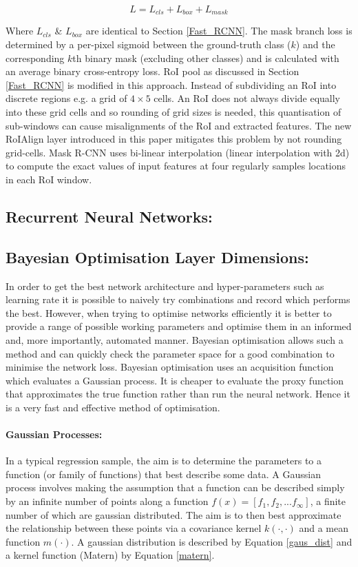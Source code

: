 \documentclass[11pt,twoside]{report}
\begin{document}
\begin{equation}
\label{maskrcnnloss}
L = L_{cls} + L_{box} + L_{mask}
\end{equation}

Where $L_{cls}$ \& $L_{box}$ are identical to Section \ref{Fast_RCNN}. The mask branch loss is determined by a per-pixel sigmoid between the ground-truth class ($k$) and the corresponding $k$th binary mask (excluding other classes) and is calculated with an average binary cross-entropy loss.
\newline \newline
RoI pool as discussed in Section \ref{Fast_RCNN} is modified in this approach. Instead of subdividing an RoI into discrete regions e.g. a grid of $4 \times 5$ cells. An RoI does not always divide equally into these grid cells and so rounding of grid sizes is needed, this quantisation of sub-windows can cause misalignments of the RoI and extracted features. The new RoIAlign layer introduced in this paper mitigates this problem by not rounding grid-cells. Mask R-CNN uses bi-linear interpolation (linear interpolation with 2d) to compute the exact values of input features at four regularly samples locations in each RoI window.


\subsection{Recurrent Neural Networks:}

\subsection{Bayesian Optimisation Layer Dimensions:}
In order to get the best network architecture and hyper-parameters such as learning rate it is possible to naively try combinations and record which performs the best. However, when trying to optimise networks efficiently it is better to provide a range of possible working parameters and optimise them in an informed and, more importantly, automated manner. Bayesian optimisation allows such a method and can quickly check the parameter space for a good combination to minimise the network loss. Bayesian optimisation uses an acquisition function which evaluates a Gaussian process. It is cheaper to evaluate the proxy function that approximates the true function rather than run the neural network. Hence it is a very fast and effective method of optimisation.

\paragraph{Gaussian Processes:}
In a typical regression sample, the aim is to determine the parameters to a function (or family of functions) that best describe some data. A Gaussian process involves making the assumption that a function can be described simply by an infinite number of points along a function $f(x) = [f_{1},f_{2},...f_{\infty}]$, a finite number of which are gaussian distributed. The aim is to then best approximate the relationship between these points via a covariance kernel $k(\cdot,\cdot)$ and a mean function $m(\cdot)$. A gaussian distribution is described by Equation \ref{gaus_dist} and a kernel function (Matern) by Equation \ref{matern}.
\end{document}
